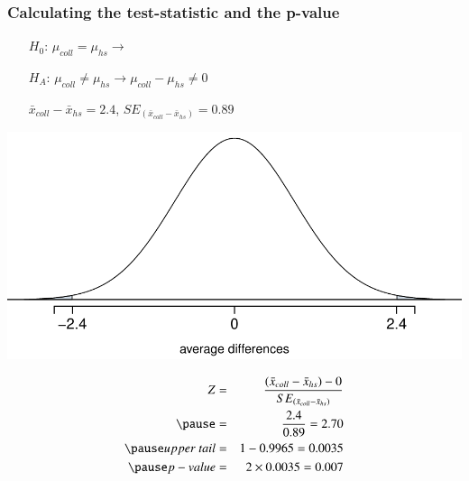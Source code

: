 \begin{frame}[shrink]
\frametitle{Calculating the test-statistic and the p-value}

\begin{itemize}
\item[$H_0$:] $\mu_{coll} = \mu_{hs} \rightarrow$  \\
\item[$H_A$:] $\mu_{coll} \neq \mu_{hs} \rightarrow \mu_{coll} - \mu_{hs} \ne 0$  \\
\item[]
\item[] $\bar{x}_{coll} - \bar{x}_{hs} = 2.4$, $SE_(\bar{x}_{coll} - \bar{x}_{hs}) = 0.89$
\end{itemize}


\pause

{
\begin{center}
\includegraphics[width=\textwidth]{5-2_diff_two_mean/figures/hrs_edu/hrs_norm}
\end{center}
}
{
\pause
\small{
\begin{eqnarray*}
Z &=& \frac{(\bar{x}_{coll} - \bar{x}_{hs}) - 0}{ SE_{(\bar{x}_{coll} - \bar{x}_{hs})} } \\
\pause
&=& \frac{2.4}{0.89} = 2.70 \\
\pause
upper~tail &=&  1 -  0.9965 = 0.0035 \\
\pause
p-value &=& 2 \times 0.0035 = 0.007
\end{eqnarray*}
}
}

\end{frame}


